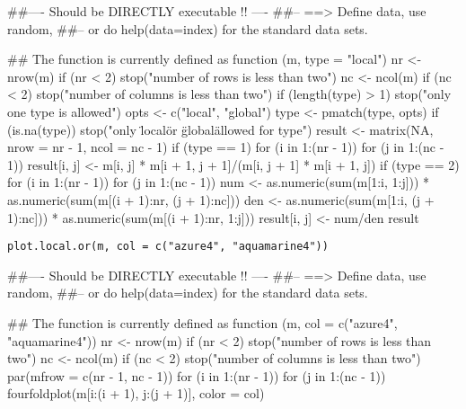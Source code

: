 \documentclass[letterpaper]{book}
\begin{document}
%
\begin{Examples}
\begin{ExampleCode}
##---- Should be DIRECTLY executable !! ----
##-- ==>  Define data, use random,
##--	or do  help(data=index)  for the standard data sets.

## The function is currently defined as
function (m, type = "local") 
{
    nr <- nrow(m)
    if (nr < 2) 
        stop("number of rows is less than two")
    nc <- ncol(m)
    if (nc < 2) 
        stop("number of columns is less than two")
    if (length(type) > 1) 
        stop("only one type is allowed")
    opts <- c("local", "global")
    type <- pmatch(type, opts)
    if (is.na(type)) 
        stop("only \"local\" or \"global\" allowed for type")
    result <- matrix(NA, nrow = nr - 1, ncol = nc - 1)
    if (type == 1) 
        for (i in 1:(nr - 1)) for (j in 1:(nc - 1)) result[i, 
            j] <- m[i, j] * m[i + 1, j + 1]/(m[i, j + 1] * m[i + 
            1, j])
    if (type == 2) 
        for (i in 1:(nr - 1)) for (j in 1:(nc - 1)) {
            num <- as.numeric(sum(m[1:i, 1:j])) * as.numeric(sum(m[(i + 
                1):nr, (j + 1):nc]))
            den <- as.numeric(sum(m[1:i, (j + 1):nc])) * as.numeric(sum(m[(i + 
                1):nr, 1:j]))
            result[i, j] <- num/den
        }
    result
  }
\end{ExampleCode}
\end{Examples}
%
\begin{Usage}
\begin{verbatim}
plot.local.or(m, col = c("azure4", "aquamarine4"))
\end{verbatim}
\end{Usage}
%
\begin{Arguments}
\begin{ldescription}
\item[\code{m}] 


\item[\code{col}] 


\end{ldescription}
\end{Arguments}
%
\begin{Examples}
\begin{ExampleCode}
##---- Should be DIRECTLY executable !! ----
##-- ==>  Define data, use random,
##--	or do  help(data=index)  for the standard data sets.

## The function is currently defined as
function (m, col = c("azure4", "aquamarine4")) 
{
    nr <- nrow(m)
    if (nr < 2) 
        stop("number of rows is less than two")
    nc <- ncol(m)
    if (nc < 2) 
        stop("number of columns is less than two")
    par(mfrow = c(nr - 1, nc - 1))
    for (i in 1:(nr - 1)) for (j in 1:(nc - 1)) {
        fourfoldplot(m[i:(i + 1), j:(j + 1)], color = col)
    }
  }
\end{ExampleCode}
\end{Examples}
\printindex{}
\end{document}
